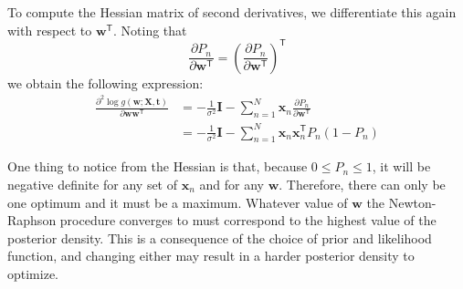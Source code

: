 To compute the Hessian matrix of second derivatives, we differentiate this again
with respect to $\mathbf{w}^{\mathsf{T}}$. Noting that
\begin{equation*}
\frac{\partial P_n}{\partial \mathbf{w}^{\mathsf{T}}} = 
\left(
  \frac{\partial P_n}{\partial \mathbf{w}^{\mathsf{T}}}
\right)^{\mathsf{T}}
\end{equation*}
we obtain the following expression:
\begin{align}
\frac{\partial^2 \log g(\mathbf{w}; \mathbf{X}, \mathbf{t})}
{\partial \mathbf{w} \mathbf{w}^{\mathsf{T}}} & = 
-\frac{1}{\sigma^2} \mathbf{I} -
\sum_{n=1}^{N} \mathbf{x}_{n} \frac{\partial P_n}{\partial \mathbf{w}^{\mathsf{T}}} \nonumber \\
& = -\frac{1}{\sigma^2} \mathbf{I}
- \sum_{n=1}^{N} \mathbf{x}_n \mathbf{x}_{n}^{\mathsf{T}} P_n (1 - P_n)
\end{align}

One thing to notice from the Hessian is that, because $0 \leq P_n \leq 1$,
it will be
negative definite for any set of $\mathbf{x}_n$
and for any $\mathbf{w}$. Therefore,
there can only be one optimum and it must be a maximum. Whatever value of $\mathbf{w}$
the Newton-Raphson procedure converges to must correspond to the highest value
of the posterior density. This is a consequence of the choice of prior and likelihood
function, and changing either may result in a harder posterior density to optimize.

